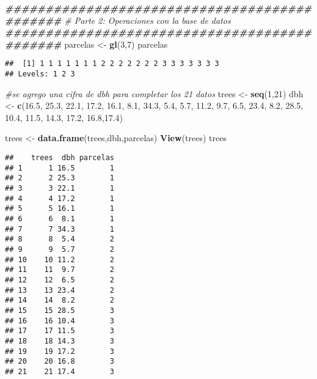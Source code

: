 \documentclass[
]{article}
\newenvironment{Shaded}{\begin{snugshade}}{\end{snugshade}}
\newcommand{\CommentTok}[1]{\textcolor[rgb]{0.56,0.35,0.01}{\textit{#1}}}
\newcommand{\DecValTok}[1]{\textcolor[rgb]{0.00,0.00,0.81}{#1}}
\newcommand{\DocumentationTok}[1]{\textcolor[rgb]{0.56,0.35,0.01}{\textbf{\textit{#1}}}}
\newcommand{\FloatTok}[1]{\textcolor[rgb]{0.00,0.00,0.81}{#1}}
\newcommand{\FunctionTok}[1]{\textcolor[rgb]{0.13,0.29,0.53}{\textbf{#1}}}
\newcommand{\NormalTok}[1]{#1}
\newcommand{\OtherTok}[1]{\textcolor[rgb]{0.56,0.35,0.01}{#1}}
\begin{document}
\begin{Shaded}
\begin{Highlighting}[]
\DocumentationTok{\#\#\#\#\#\#\#\#\#\#\#\#\#\#\#\#\#\#\#\#\#\#\#\#\#\#\#\#\#\#\#\#\#\#\#\#\#\#\#\#\#\#\#\#\#}
\CommentTok{\# Parte 2: Operaciones con la base de datos }
\DocumentationTok{\#\#\#\#\#\#\#\#\#\#\#\#\#\#\#\#\#\#\#\#\#\#\#\#\#\#\#\#\#\#\#\#\#\#\#\#\#\#\#\#\#\#\#\#\#}
\NormalTok{parcelas }\OtherTok{\textless{}{-}} \FunctionTok{gl}\NormalTok{(}\DecValTok{3}\NormalTok{,}\DecValTok{7}\NormalTok{)}
\NormalTok{parcelas}
\end{Highlighting}
\end{Shaded}

\begin{verbatim}
##  [1] 1 1 1 1 1 1 1 2 2 2 2 2 2 2 3 3 3 3 3 3 3
## Levels: 1 2 3
\end{verbatim}

\begin{Shaded}
\begin{Highlighting}[]
\CommentTok{\#se agrego una cifra de dbh para completar los 21 datos}
\NormalTok{trees }\OtherTok{\textless{}{-}} \FunctionTok{seq}\NormalTok{(}\DecValTok{1}\NormalTok{,}\DecValTok{21}\NormalTok{)}
\NormalTok{dbh }\OtherTok{\textless{}{-}} \FunctionTok{c}\NormalTok{(}\FloatTok{16.5}\NormalTok{, }\FloatTok{25.3}\NormalTok{, }\FloatTok{22.1}\NormalTok{, }\FloatTok{17.2}\NormalTok{, }\FloatTok{16.1}\NormalTok{, }\FloatTok{8.1}\NormalTok{, }\FloatTok{34.3}\NormalTok{, }\FloatTok{5.4}\NormalTok{, }\FloatTok{5.7}\NormalTok{, }\FloatTok{11.2}\NormalTok{, }\FloatTok{9.7}\NormalTok{, }\FloatTok{6.5}\NormalTok{, }\FloatTok{23.4}\NormalTok{, }
         \FloatTok{8.2}\NormalTok{, }\FloatTok{28.5}\NormalTok{, }\FloatTok{10.4}\NormalTok{, }\FloatTok{11.5}\NormalTok{, }\FloatTok{14.3}\NormalTok{, }\FloatTok{17.2}\NormalTok{, }\FloatTok{16.8}\NormalTok{,}\FloatTok{17.4}\NormalTok{)}

\NormalTok{trees }\OtherTok{\textless{}{-}} \FunctionTok{data.frame}\NormalTok{(trees,dbh,parcelas)}
\FunctionTok{View}\NormalTok{(trees)}
\NormalTok{trees}
\end{Highlighting}
\end{Shaded}

\begin{verbatim}
##    trees  dbh parcelas
## 1      1 16.5        1
## 2      2 25.3        1
## 3      3 22.1        1
## 4      4 17.2        1
## 5      5 16.1        1
## 6      6  8.1        1
## 7      7 34.3        1
## 8      8  5.4        2
## 9      9  5.7        2
## 10    10 11.2        2
## 11    11  9.7        2
## 12    12  6.5        2
## 13    13 23.4        2
## 14    14  8.2        2
## 15    15 28.5        3
## 16    16 10.4        3
## 17    17 11.5        3
## 18    18 14.3        3
## 19    19 17.2        3
## 20    20 16.8        3
## 21    21 17.4        3
\end{verbatim}
\end{document}
